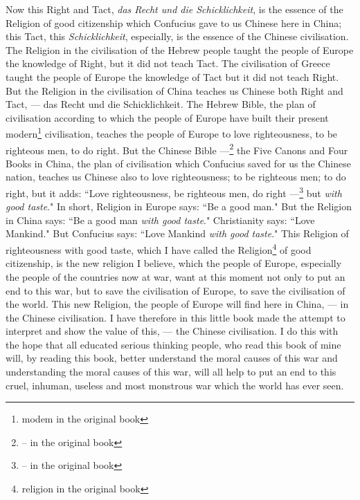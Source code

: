 Now this Right and Tact, \emph{das Recht und die Schicklichkeit}, is the essence of the Religion of good citizenship which Confucius gave to us Chinese here in China; this Tact, this \emph{Schicklichkeit}, especially, is the essence of the Chinese civilisation.
The Religion in the civilisation of the Hebrew people taught the people of Europe the knowledge of Right, but it did not teach Tact.
The civilisation of Greece taught the people of Europe the knowledge of Tact but it did not teach Right.
But the Religion in the civilisation of China teaches us Chinese both Right and Tact, --- das Recht und die Schicklichkeit.
The Hebrew Bible, the plan of civilisation according to which the people of Europe have built their present modern\footnote{modem in the original book} civilisation, teaches the people of Europe to love righteousness, to be righteous men, to do right.
But the Chinese Bible ---\footnote{-- in the original book} the Five Canons and Four Books in China, the plan of civilisation which Confucius saved for us the Chinese nation, teaches us Chinese also to love righteousness; to be righteous men; to do right, but it adds: ``Love righteousness, be righteous men, do right ---\footnote{-- in the original book} but \emph{with good taste}."
In short, Religion in Europe says: ``Be a good man."
But the Religion in China says: ``Be a good man \emph{with good taste}."
Christianity says: ``Love Mankind."
But Confucius says: ``Love Mankind \emph{with good taste}."
This Religion of righteousness with good taste, which I have called the Religion\footnote{religion in the original book} of good citizenship, is the new religion I believe, which the people of Europe, especially the people of the countries now at war, want at this moment not only to put an end to this war, but to save the civilisation of Europe, to save the civilisation of the world.
This new Religion, the people of Europe will find here in China, --- in the Chinese civilisation.
I have therefore in this little book made the attempt to interpret and show the value of this, --- the Chinese civilisation.
I do this with the hope that all educated serious thinking people, who read this book of mine will, by reading this book, better understand the moral causes of this war and understanding the moral causes of this war, will all help to put an end to this cruel, inhuman, useless and most monstrous war which the world has ever seen.

